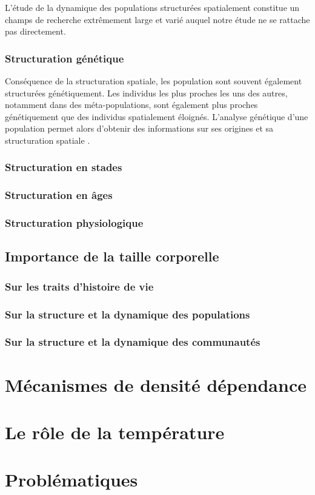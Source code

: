 L'étude de la dynamique des populations structurées spatialement constitue un
champs de recherche extrêmement large et varié auquel notre étude ne se rattache
pas directement. 

\subsubsection{Structuration génétique}

Conséquence de la structuration spatiale, les population sont souvent également
structurées génétiquement. Les individus les plus proches les uns des autres,
notamment dans des méta-populations, sont également plus proches génétiquement
que des individus spatialement éloignés. L'analyse génétique d'une population
permet alors d'obtenir des informations sur ses origines et sa structuration
spatiale \autocite{repaci2006a,booth2009a,jorde2007a}.

\subsubsection{Structuration en stades}
\subsubsection{Structuration en âges}
\subsubsection{Structuration physiologique}

\subsection{Importance de la taille corporelle}

\subsubsection{Sur les traits d'histoire de vie}

\subsubsection{Sur la structure et la dynamique des populations}

\subsubsection{Sur la structure et la dynamique des communautés}






\section{Mécanismes de densité dépendance}

\section{Le rôle de la température}

\section{Problématiques}	
